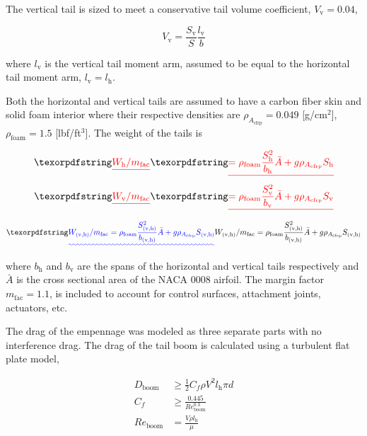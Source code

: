 The vertical tail is sized to meet a conservative tail volume coefficient, $V_{\text{v}}= 0.04$,\cite{aircraftrules}

\begin{equation}
    \label{e:vtv}
    V_{\text{v}} = \frac{S_{\text{v}}}{S} \frac{l_{\text{v}}}{b}
\end{equation}

where $l_{\text{v}}$ is the vertical tail moment arm, assumed to be equal to the horizontal tail moment arm, $l_{\text{v}} = l_{\text{h}}$.

Both the horizontal and vertical tails are assumed to have a carbon fiber skin and solid foam interior where their respective densities are $\rho_{A_{\text{cfrp}}} = 0.049$ [g/cm$^2$], $\rho_{\text{foam}} = 1.5$ [lbf/ft$^3$]. 
The weight of the \DIFdelbegin {}\DIFdelend tails is

\DIFdelbegin \begin{eqnarray*}
    \DIFdel{\label{e:htweight}
    W_{\text{h}}/m_{\text{fac}} }&\DIFdel{= \rho_{\text{foam}} \frac{S_{\text{h}}^2}{b_{\text{h}}} \bar{A} + g\rho_{A_{\text{cfrp}}} S_{\text{h}} }\\
    \DIFdel{\label{e:vtweight}
    W_{\text{v}}/m_{\text{fac}} }&\DIFdel{= \rho_{\text{foam}} \frac{S_{\text{v}}^2}{b_{\text{v}}} \bar{A} + g\rho_{A_{\text{cfrp}}} S_{\text{v}}
}\end{eqnarray*}
\DIFdelend \DIFaddbegin \begin{equation}
    \DIFadd{W_{\text{(v,h)}}/m_{\text{fac}} = \rho_{\text{foam}} \frac{S_{\text{(v,h)}}^2}{b_{\text{(v,h)}}} \bar{A} + g\rho_{A_{\text{cfrp}}} S_{\text{(v,h)}} }\\
\end{equation}
\DIFaddend 

where $b_{\text{h}}$ and $b_{\text{v}}$ are the spans of the horizontal and vertical tails respectively and $\bar{A}$ is the cross sectional area of the NACA 0008 airfoil. The margin factor $m_{\text{fac}}=1.1$, is included to account for control surfaces, attachment joints, actuators, etc. 

The drag of the empennage was modeled as three separate parts with no interference drag.  The drag of the tail boom is calculated using a turbulent flat plate model,

\begin{align}
    \label{e:boomdrag}
    D_{\text{boom}} &\geq \frac{1}{2} C_f \rho V^2 l_{\text{h}}\pi d \\
    C_f &\geq \frac{0.445}{Re_{\text{boom}}^{0.3}} \\
    Re_{\text{boom}} &= \frac{V\rho l_{\text{h}}}{\mu}
\end{align}

